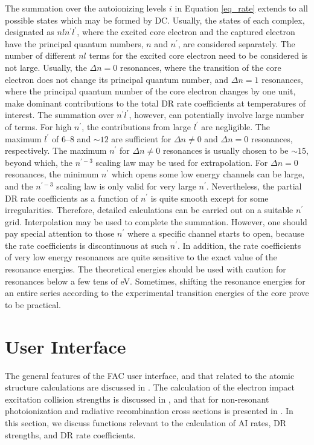 \documentclass{elsart}
\begin{document}
The summation over the autoionizing levels $i$ in Equation \ref{eq_rate}
extends to all possible states which may be formed by DC. Usually, the states
of each 
complex, designated as $nln^\prime l^\prime$, where the excited core electron
and the captured electron have the principal quantum numbers, $n$ and
$n^\prime$, are considered separately. 
The number of different $nl$ terms for the excited core
electron need to be considered is not large. Usually, the $\Delta n = 0$
resonances, where the transition of the core electron does not change its
principal quantum number, and $\Delta n = 1$ resonances, where the principal
quantum number of the core electron changes by one unit, make
dominant contributions to the 
total DR rate coefficients at temperatures of interest. The summation
over $n^\prime l^\prime$, however, can potentially involve large number of
terms. For high $n^\prime$, the contributions from large $l^\prime$ are
negligible. The maximum $l^\prime$ of 6--8 and $\sim 12$ are sufficient for
$\Delta n \ne 0$ and $\Delta n = 0$ resonances, respectively. The maximum
$n^\prime$ for $\Delta n \ne 0$ resonances is usually chosen to be $\sim 15$,
beyond which, the $n^{\prime -3}$ scaling law may be used for
extrapolation. For $\Delta n = 0$ resonances, the minimum $n^\prime$ which
opens some low energy channels can be large, and the $n^{\prime -3}$ scaling
law is only valid for very large $n^\prime$. Nevertheless, the partial DR rate
coefficients as a function of $n^\prime$ is quite smooth except for some
irregularities. Therefore, detailed 
calculations can be carried out on a suitable $n^\prime$ grid.
Interpolation may be used to complete the summation. However, one should pay
special attention to those $n^\prime$ where a specific channel starts to
open, because the rate coefficients is discontinuous at such $n^\prime$. In
addition, the rate coefficients of very low energy resonances are quite
sensitive to the exact value of the resonance energies. The theoretical
energies should be used with caution for resonances below a few tens of
eV. Sometimes, shifting the resonance energies for an entire series according
to the experimental transition energies of the core prove to be practical.

\section{User Interface}
\label{sec_program}
The general features of the FAC user interface, and that related to the atomic
structure calculations are discussed in . The calculation of 
the electron impact excitation collision strengths is discussed in
, and that for non-resonant photoionization and radiative
recombination cross sections is presented in . In this
section, we discuss functions relevant to the calculation of AI rates, DR
strengths, and DR rate coefficients. 
\end{document}
